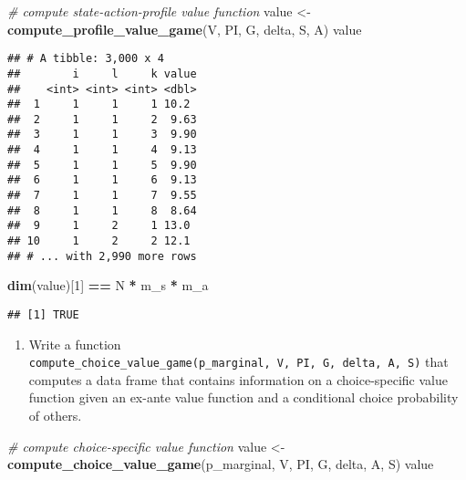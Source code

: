\documentclass[
]{book}
\newenvironment{Shaded}{\begin{snugshade}}{\end{snugshade}}
\newcommand{\CommentTok}[1]{\textcolor[rgb]{0.56,0.35,0.01}{\textit{#1}}}
\newcommand{\DecValTok}[1]{\textcolor[rgb]{0.00,0.00,0.81}{#1}}
\newcommand{\KeywordTok}[1]{\textcolor[rgb]{0.13,0.29,0.53}{\textbf{#1}}}
\newcommand{\NormalTok}[1]{#1}
\newcommand{\OperatorTok}[1]{\textcolor[rgb]{0.81,0.36,0.00}{\textbf{#1}}}
\newcommand{\StringTok}[1]{\textcolor[rgb]{0.31,0.60,0.02}{#1}}
\providecommand{\tightlist}{%
  \setlength{\itemsep}{0pt}\setlength{\parskip}{0pt}}
\begin{document}
\begin{Shaded}
\begin{Highlighting}[]
\CommentTok{# compute state-action-profile value function}
\NormalTok{value <-}\StringTok{ }\KeywordTok{compute_profile_value_game}\NormalTok{(V, PI, G, delta, S, A)}
\NormalTok{value}
\end{Highlighting}
\end{Shaded}

\begin{verbatim}
## # A tibble: 3,000 x 4
##        i     l     k value
##    <int> <int> <int> <dbl>
##  1     1     1     1 10.2 
##  2     1     1     2  9.63
##  3     1     1     3  9.90
##  4     1     1     4  9.13
##  5     1     1     5  9.90
##  6     1     1     6  9.13
##  7     1     1     7  9.55
##  8     1     1     8  8.64
##  9     1     2     1 13.0 
## 10     1     2     2 12.1 
## # ... with 2,990 more rows
\end{verbatim}

\begin{Shaded}
\begin{Highlighting}[]
\KeywordTok{dim}\NormalTok{(value)[}\DecValTok{1}\NormalTok{] }\OperatorTok{==}\StringTok{ }\NormalTok{N }\OperatorTok{*}\StringTok{ }\NormalTok{m_s }\OperatorTok{*}\StringTok{ }\NormalTok{m_a}
\end{Highlighting}
\end{Shaded}

\begin{verbatim}
## [1] TRUE
\end{verbatim}

\begin{enumerate}
\def\labelenumi{\arabic{enumi}.}
\setcounter{enumi}{8}
\tightlist
\item
  Write a function \texttt{compute\_choice\_value\_game(p\_marginal,\ V,\ PI,\ G,\ delta,\ A,\ S)} that computes a data frame that contains information on a choice-specific value function given an ex-ante value function and a conditional choice probability of others.
\end{enumerate}

\begin{Shaded}
\begin{Highlighting}[]
\CommentTok{# compute choice-specific value function}
\NormalTok{value <-}\StringTok{ }\KeywordTok{compute_choice_value_game}\NormalTok{(p_marginal, V, PI, G, delta, A, S)}
\NormalTok{value}
\end{Highlighting}
\end{Shaded}
\end{document}
